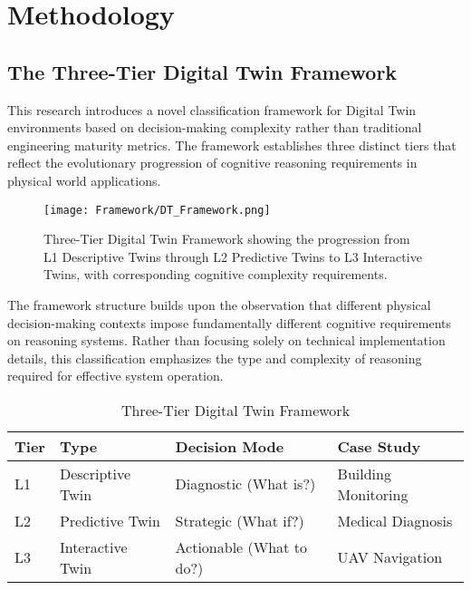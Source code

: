 
\chapter{Methodology} \label{chp:methodology}

\section{The Three-Tier Digital Twin Framework}

This research introduces a novel classification framework for Digital Twin environments based on decision-making complexity rather than traditional engineering maturity metrics. The framework establishes three distinct tiers that reflect the evolutionary progression of cognitive reasoning requirements in physical world applications.

\begin{figure}[htbp]
\centering
\texttt{[image: Framework/DT\_Framework.png]}
\caption{Three-Tier Digital Twin Framework showing the progression from L1 Descriptive Twins through L2 Predictive Twins to L3 Interactive Twins, with corresponding cognitive complexity requirements.}
\label{fig:dt_framework}
\end{figure}

The framework structure builds upon the observation that different physical decision-making contexts impose fundamentally different cognitive requirements on reasoning systems. Rather than focusing solely on technical implementation details, this classification emphasizes the type and complexity of reasoning required for effective system operation.

\begin{table}[h]
\centering
\caption{Three-Tier Digital Twin Framework}
\label{tab:three_tier_framework}
\begin{tabular}{llll}
\toprule
\textbf{Tier} & \textbf{Type} & \textbf{Decision Mode} & \textbf{Case Study} \\
\midrule
L1 & Descriptive Twin & Diagnostic (What is?) & Building Monitoring \\
L2 & Predictive Twin & Strategic (What if?) & Medical Diagnosis \\
L3 & Interactive Twin & Actionable (What to do?) & UAV Navigation \\
\bottomrule
\end{tabular}
\end{table}

